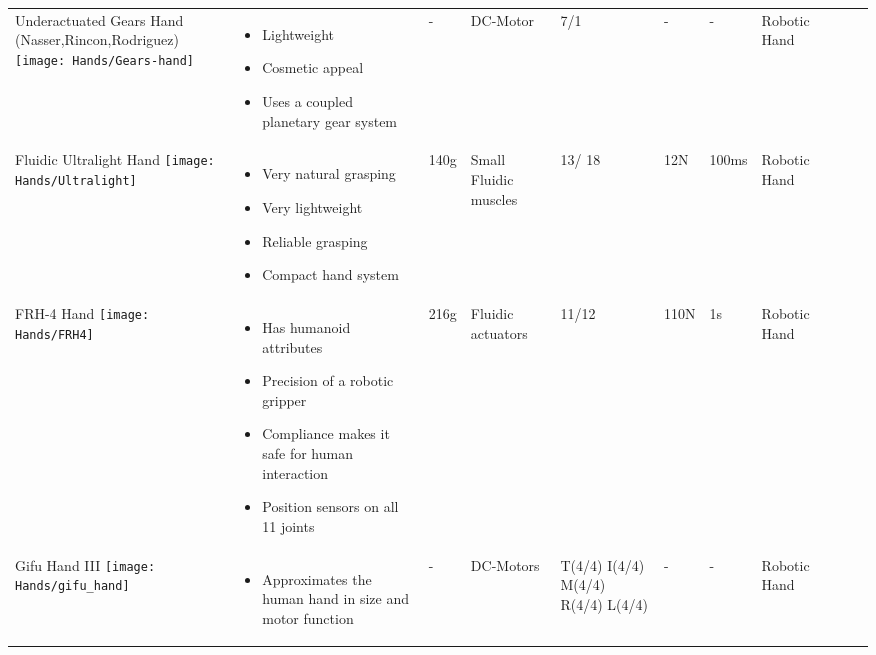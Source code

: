 \documentclass[main]{subfiles}
\begin{document}
\begin{longtable}{@{}p{6cm}p{4cm}p{0.7cm}p{1.2cm}p{1cm}p{1cm}p{1cm}p{1cm}p{1cm}p{1cm}p{2cm}@{}}
\parbox{6cm}{Underactuated Gears Hand\\ (Nasser,Rincon,Rodriguez)} \newline
\texttt{[image: Hands/Gears-hand]}& 
\begin{itemize}\itemsep0em
\item Lightweight
\item Cosmetic appeal
\item Uses a coupled planetary gear system
\end{itemize} 
& - & DC-Motor & 7/1 & - & - & Robotic Hand\\

Fluidic Ultralight Hand \newline
\texttt{[image: Hands/Ultralight]}& 
\begin{itemize}\itemsep0em
\item Very natural grasping
\item Very lightweight
\item Reliable grasping
\item Compact hand system
\end{itemize} 
& 140g & Small Fluidic muscles & 13/ 18 & 12N & 100ms & Robotic Hand\\

FRH-4 Hand \newline
\texttt{[image: Hands/FRH4]}& 
\begin{itemize}\itemsep0em
\item Has humanoid attributes
\item Precision of a robotic gripper
\item Compliance makes it safe for human interaction
\item Position sensors on all 11 joints
\end{itemize} 
& 216g & Fluidic actuators & 11/12 & 110N & 1s & Robotic Hand\\

Gifu Hand III \newline
\texttt{[image: Hands/gifu\_hand]}& 
\begin{itemize}\itemsep0em
\item Approximates the human hand in size and motor function 
\end{itemize} 
& - & DC-Motors & T(4/4) I(4/4) M(4/4) R(4/4) L(4/4) & - & - & Robotic Hand\\


\end{longtable}
\end{document}
